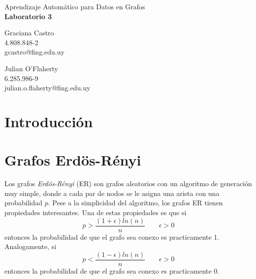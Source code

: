 \documentclass{article}
\begin{document}
\begin{center}
    {\Large Aprendizaje Automático para Datos en Grafos} \\
    {\LARGE \textbf{Laboratorio 3}} \\
    \vspace{2em}
    \begin{minipage}{0.45\textwidth}
        \centering
        Graciana Castro \\
        4.808.848-2 \\
        gcastro@fing.edu.uy
    \end{minipage}
    \hfill
    \begin{minipage}{0.45\textwidth}
        \centering
        Julian O'Flaherty \\
        6.285.986-9 \\
        julian.o.flaherty@fing.edu.uy
    \end{minipage}
\end{center}


\section{Introducción}

\section{Grafos Erdös-Rényi}

Los grafos \emph{Erdös-Rényi}\cite{erdos1959random} (ER) son grafos aleatorios con un algoritmo de generación muy simple, donde
a cada par de nodos se le asigna una arista con una probabilidad $p$. Pese a la simplicidad del algoritmo,
los grafos ER tienen propiedades interesantes. Una de estas propiedades es que si 
\begin{equation}
    \label{eq:er_threshold_1}
    p > \frac{(1 + \epsilon)ln(n)}{n} \quad\quad \epsilon > 0
\end{equation}
entonces la probabilidad de que el grafo sea conexo es practicamente 1. Analogamente,
si 
\begin{equation}
    \label{eq:er_threshold_2}
    p < \frac{(1 - \epsilon)ln(n)}{n} \quad\quad \epsilon > 0
\end{equation}
entonces la probabilidad de que el grafo sea conexo es practicamente 0.
\end{document}
